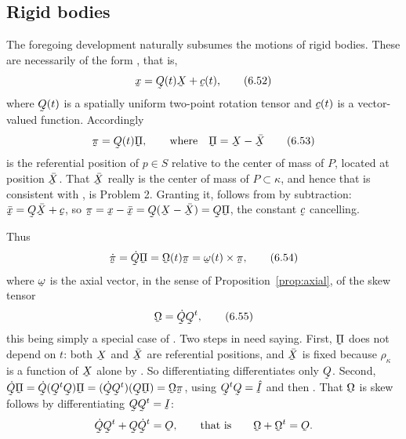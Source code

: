 \subsection{Rigid bodies}\label{sec:ch6rigid}

The foregoing development naturally subsumes the motions of rigid
bodies. These are necessarily of the form , that is,
\begin{equation}
   \bx=\bQ(t)\bX+\bc(t),
   \tag{6.52}\label{eq:6.52}
\end{equation}
where $\bQ(t)$ is a spatially uniform two-point rotation tensor and
$\bc(t)$ is a vector-valued function. Accordingly
\begin{equation}
   \vek\pi=\bQ(t)\vek\Pi,\qquad\text{where}\quad
   \vek\Pi=\bX-\bar{\bX}
   \tag{6.53}\label{eq:6.53}
\end{equation}
is the referential position of $p\in S$ relative to the center of mass
of $P$, located at position $\bar{\bX}$. That $\bar{\bX}$ really is the
center of mass of $P\subset\kappa$, and hence that  is
consistent with , is Problem 2. Granting it, 
follows from  by subtraction: $\bar{\bx}=\bQ\bar{\bX}+\bc$,
so $\vek\pi=\bx-\bar{\bx}=\bQ(\bX-\bar{\bX})=\bQ\vek\Pi$, the constant
$\bc$ cancelling.

Thus
\begin{equation}
   \dot{\vek\pi}=\dot\bQ\vek\Pi=\bOm(t)\vek\pi=\bom(t)\times\vek\pi ,
   \tag{6.54}\label{eq:6.54}
\end{equation}
where $\bom$ is the axial vector, in the sense of
Proposition~\ref{prop:axial}, of the skew tensor
\begin{equation}
   \bOm=\dot\bQ\bQ^{t},
   \tag{6.55}\label{eq:6.55}
\end{equation}
this being simply a special case of . Two steps in 
need saying. First, $\vek\Pi$ does not depend on $t$: both $\bX$ and
$\bar{\bX}$ are referential positions, and $\bar{\bX}$ is fixed because
$\rho_{\kappa}$ is a function of $\bX$ alone by . So
differentiating  differentiates only $\bQ$. Second,
$\dot\bQ\vek\Pi=\dot\bQ(\bQ^{t}\bQ)\vek\Pi=(\dot\bQ\bQ^{t})(\bQ
\vek\Pi)=\bOm\vek\pi$, using $\bQ^{t}\bQ=\hI$ and then . That
$\bOm$ is skew follows by differentiating $\bQ\bQ^{t}=\I$:
\[
   \dot\bQ\bQ^{t}+\bQ\dot\bQ^{t}=\Ob ,\qquad\text{that is}\qquad
   \bOm+\bOm^{t}=\Ob .
\]

